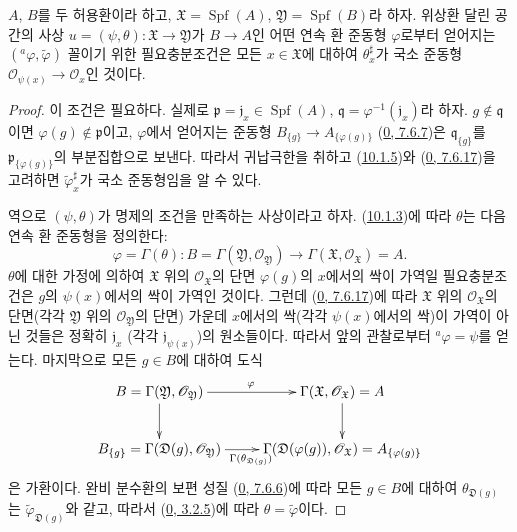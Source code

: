 \begin{proposition}[10.2.2]
\label{I.10.2.2-ko}
$A$, $B$를 두 허용환이라 하고,
$\mathfrak{X}=\operatorname{Spf}(A)$,
$\mathfrak{Y}=\operatorname{Spf}(B)$라 하자. 위상환 달린 공간의 사상
$u=(\psi,\theta):\mathfrak{X}\to\mathfrak{Y}$가 $B\to A$인 어떤 연속 환 준동형
$\varphi$로부터 얻어지는
$({}^a\varphi,\widetilde{\varphi})$ 꼴이기 위한 필요충분조건은 모든
$x\in\mathfrak{X}$에 대하여 $\theta_x^\sharp$가 국소 준동형
$\mathscr{O}_{\psi(x)}\to\mathscr{O}_x$인 것이다.
\end{proposition}

\begin{proof}
이 조건은 필요하다. 실제로
$\mathfrak{p}=\mathfrak{j}_x\in\operatorname{Spf}(A)$,
$\mathfrak{q}=\varphi^{-1}(\mathfrak{j}_x)$라 하자.
$g\notin\mathfrak{q}$이면 $\varphi(g)\notin\mathfrak{p}$이고,
$\varphi$에서 얻어지는 준동형
$B_{\{g\}}\to A_{\{\varphi(g)\}}$
(\hyperref[0.7.6.7-ko]{0, 7.6.7})은
$\mathfrak{q}_{\{g\}}$를
$\mathfrak{p}_{\{\varphi(g)\}}$의 부분집합으로 보낸다. 따라서 귀납극한을
취하고 (\hyperref[I.10.1.5-ko]{10.1.5})와
(\hyperref[0.7.6.17-ko]{0, 7.6.17})을 고려하면
$\widetilde{\varphi}_x^\sharp$가 국소 준동형임을 알 수 있다.

역으로 $(\psi,\theta)$가 명제의 조건을 만족하는 사상이라고 하자.
(\hyperref[I.10.1.3-ko]{10.1.3})에 따라 $\theta$는 다음 연속 환 준동형을
정의한다:
\[
  \varphi=\Gamma(\theta):
  B=\Gamma(\mathfrak{Y},\mathscr{O}_{\mathfrak{Y}})
  \longrightarrow
  \Gamma(\mathfrak{X},\mathscr{O}_{\mathfrak{X}})=A.
\]
$\theta$에 대한 가정에 의하여 $\mathfrak{X}$ 위의
$\mathscr{O}_{\mathfrak{X}}$의 단면 $\varphi(g)$의 $x$에서의 싹이
가역일 필요충분조건은 $g$의 $\psi(x)$에서의 싹이 가역인 것이다. 그런데
(\hyperref[0.7.6.17-ko]{0, 7.6.17})에 따라
$\mathfrak{X}$ 위의 $\mathscr{O}_{\mathfrak{X}}$의 단면(각각
$\mathfrak{Y}$ 위의 $\mathscr{O}_{\mathfrak{Y}}$의 단면) 가운데
$x$에서의 싹(각각 $\psi(x)$에서의 싹)이 가역이 아닌 것들은 정확히
$\mathfrak{j}_x$
(각각 $\mathfrak{j}_{\psi(x)}$)의 원소들이다. 따라서 앞의 관찰로부터
${}^a\varphi=\psi$를 얻는다. 마지막으로 모든 $g\in B$에 대하여 도식
\[
  \xymatrix{
    B=\Gamma(\mathfrak{Y},\mathscr{O}_{\mathfrak{Y}})
      \ar[r]^\varphi\ar[d] &
    \Gamma(\mathfrak{X},\mathscr{O}_{\mathfrak{X}})=A\ar[d]\\
    B_{\{g\}}=\Gamma(\mathfrak{D}(g),\mathscr{O}_{\mathfrak{Y}})
      \ar[r]_{\Gamma(\theta_{\mathfrak{D}(g)})} &
    \Gamma(\mathfrak{D}(\varphi(g)),\mathscr{O}_{\mathfrak{X}})
      =A_{\{\varphi(g)\}}
  }
\]
은 가환이다. 완비 분수환의 보편 성질
(\hyperref[0.7.6.6-ko]{0, 7.6.6})에 따라 모든 $g\in B$에 대하여
$\theta_{\mathfrak{D}(g)}$는
$\widetilde{\varphi}_{\mathfrak{D}(g)}$와 같고, 따라서
(\hyperref[0.3.2.5-ko]{0, 3.2.5})에 따라
$\theta=\widetilde{\varphi}$이다.
\end{proof}

